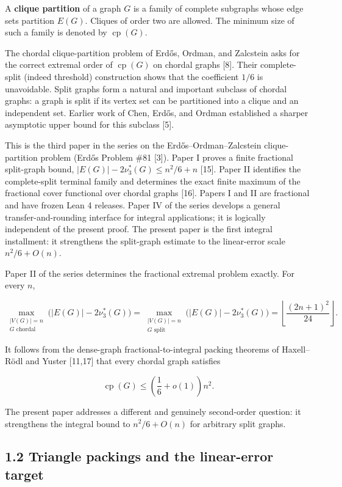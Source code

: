 \documentclass[
  11pt,
]{article}
\begin{document}
A \textbf{clique partition} of a graph \(G\) is a family of complete
subgraphs whose edge sets partition \(E(G)\). Cliques of order two are
allowed. The minimum size of such a family is denoted by
\(\operatorname{cp}(G)\).

The chordal clique-partition problem of Erdős, Ordman, and Zalcstein
asks for the correct extremal order of \(\operatorname{cp}(G)\) on
chordal graphs {[}8{]}. Their complete-split (indeed threshold)
construction shows that the coefficient \(1/6\) is unavoidable. Split
graphs form a natural and important subclass of chordal graphs: a graph
is split if its vertex set can be partitioned into a clique and an
independent set. Earlier work of Chen, Erdős, and Ordman established a
sharper asymptotic upper bound for this subclass {[}5{]}.

This is the third paper in the series on the Erdős--Ordman--Zalcstein
clique-partition problem (Erdős Problem \#81 {[}3{]}). Paper I proves a
finite fractional split-graph bound, \(|E(G)|-2\nu_3^*(G)\le n^2/6+n\)
{[}15{]}. Paper II identifies the complete-split terminal family and
determines the exact finite maximum of the fractional cover functional
over chordal graphs {[}16{]}. Papers I and II are fractional and have
frozen Lean 4 releases. Paper IV of the series develops a general
transfer-and-rounding interface for integral applications; it is
logically independent of the present proof. The present paper is the
first integral installment: it strengthens the split-graph estimate to
the linear-error scale \(n^2/6+O(n)\).

Paper II of the series determines the fractional extremal problem
exactly. For every \(n\),

\[
\max_{\substack{|V(G)|=n\\G\text{ chordal}}}
\bigl(|E(G)|-2\nu_3^*(G)\bigr)
=
\max_{\substack{|V(G)|=n\\G\text{ split}}}
\bigl(|E(G)|-2\nu_3^*(G)\bigr)
=
\left\lfloor\frac{(2n+1)^2}{24}\right\rfloor.
\]

It follows from the dense-graph fractional-to-integral packing theorems
of Haxell--Rödl and Yuster {[}11,17{]} that every chordal graph
satisfies

\[
\operatorname{cp}(G)
\le
\left(\frac16+o(1)\right)n^2.
\]

The present paper addresses a different and genuinely second-order
question: it strengthens the integral bound to \(n^2/6+O(n)\) for
arbitrary split graphs.

\subsection{1.2 Triangle packings and the linear-error
target}\label{triangle-packings-and-the-linear-error-target}
\end{document}
